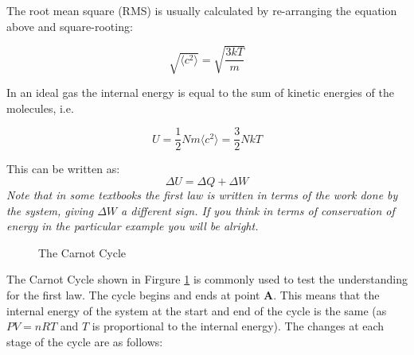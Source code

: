 \documentclass[revision-guide.tex]{subfiles}
\begin{document}

The root mean square (RMS) is usually calculated by re-arranging the equation above and square-rooting:

$$ \sqrt{\langle c^2 \rangle} = \sqrt{\frac{3kT}{m}} $$


In an ideal gas the internal energy is equal to the sum of kinetic energies of the molecules, i.e.

$$ U = \frac{1}{2}Nm\langle c^2 \rangle = \frac{3}{2}NkT $$


This can be written as:
$$ \Delta U = \Delta Q + \Delta W $$
\emph{Note that in some textbooks the first law is written in terms of the work done \emph{by} the system, giving $\Delta W$ a different sign. If you think in terms of conservation of energy in the particular example you will be alright.}

\begin{figure}[h]
  \caption{The Carnot Cycle}
  \label{carnotcycle}
\end{figure}

The Carnot Cycle shown in Firgure \ref{carnotcycle} is commonly used to test the understanding for the first law. The cycle begins and ends at point \textbf{A}. This means that the internal energy of the system at the start and end of the cycle is the same (as $PV=nRT$ and $T$ is proportional to the internal energy). The changes at each stage of the cycle are as follows:
\end{document}
